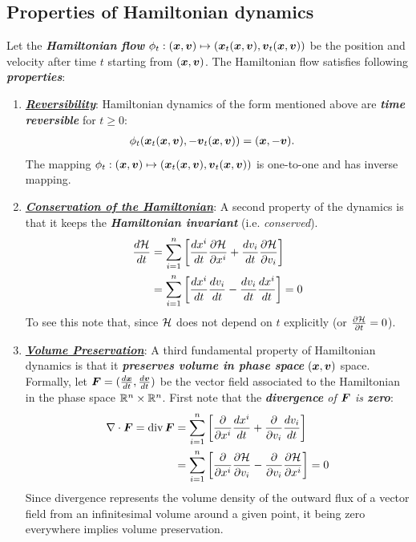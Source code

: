 \documentclass[11pt]{article}
\begin{document}
\subsection{Properties of Hamiltonian dynamics}
Let the \emph{\textbf{Hamiltonian flow}} $\phi_t : (\boldsymbol{x}, \boldsymbol{v}) \mapsto (\boldsymbol{x}_t(\boldsymbol{x}, \boldsymbol{v}), \boldsymbol{v}_t(\boldsymbol{x}, \boldsymbol{v}))$ be the position and velocity
after time $t$ starting from $(\boldsymbol{x}, \boldsymbol{v})$.  The Hamiltonian flow satisfies following \emph{\textbf{properties}}:
\begin{enumerate}
\item \underline{\emph{\textbf{Reversibility}}}: Hamiltonian dynamics of the form mentioned above are \emph{\textbf{time reversible}} for $t \ge 0$:
\begin{align}
\phi_t(\boldsymbol{x}_t(\boldsymbol{x}, \boldsymbol{v}), -\boldsymbol{v}_t(\boldsymbol{x}, \boldsymbol{v})) &= (\boldsymbol{x}, -\boldsymbol{v}). \label{eqn: Hamiltonian_reverse}
\end{align} The mapping $\phi_t : (\boldsymbol{x}, \boldsymbol{v}) \mapsto (\boldsymbol{x}_t(\boldsymbol{x}, \boldsymbol{v}), \boldsymbol{v}_t(\boldsymbol{x}, \boldsymbol{v}))$ is one-to-one and has inverse mapping.

\item  \underline{\emph{\textbf{Conservation of the Hamiltonian}}}: A second property of the dynamics is that it keeps the \emph{\textbf{Hamiltonian invariant}} (i.e. \emph{conserved}).
\begin{align}
\frac{d{\mathcal H}}{dt} &= \sum_{i=1}^{n}\left[\frac{d x^{i}}{dt}\frac{\partial {\mathcal H}}{ \partial x^{i}} + \frac{d v_i}{dt}\frac{\partial {\mathcal H}}{ \partial v_{i}} \right] \nonumber\\
&= \sum_{i=1}^{n}\left[\frac{d x^{i}}{dt} \frac{d v_i}{dt} - \frac{d v_i}{dt}\frac{d x^{i}}{dt} \right]  = 0   \label{eqn: Hamiltonian_conserve}
\end{align} To see this note that, since ${\mathcal H}$ does not depend on $t$ explicitly (or $\frac{\partial {\mathcal H}}{ \partial t} = 0$).

\item  \underline{\emph{\textbf{Volume Preservation}}}: A third fundamental property of Hamiltonian dynamics is that it \textbf{\emph{preserves volume in phase space}} $(\boldsymbol{x}, \boldsymbol{v})$ space. Formally, let $\boldsymbol{F}= (\frac{d \boldsymbol{x}}{dt}, \frac{d \boldsymbol{v}}{dt})$ be the vector field associated to the Hamiltonian in the phase space ${\mathbb R}^n \times {\mathbb R}^{n}$. First note that the \emph{\textbf{divergence} of $\boldsymbol{F}$ is \textbf{zero}}:
\begin{align}
\nabla \cdot \boldsymbol{F} = \text{div}\,\boldsymbol{F} &= \sum_{i=1}^{n}\left[\frac{\partial }{ \partial x^{i}}\frac{d x^{i}}{dt} +  \frac{\partial }{ \partial v_{i}}\frac{d v_{i}}{dt}\right] \nonumber\\
&= \sum_{i=1}^{n}\left[\frac{\partial }{ \partial x^{i}}\frac{\partial {\mathcal H}}{ \partial v_{i}}  -  \frac{\partial }{ \partial v_{i}}\frac{\partial {\mathcal H}}{ \partial x^{i}} \right] = 0\label{eqn: Hamiltonian_vol_conserve}
\end{align} Since divergence represents the volume density of the outward flux of a vector field from an infinitesimal volume around a given point, it being zero everywhere implies volume preservation. 


\end{enumerate}
\end{document}
